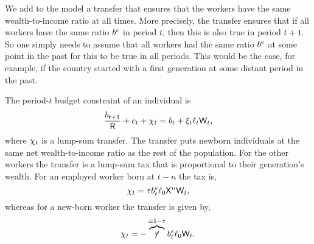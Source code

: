 \documentclass[titlepage,abstract,letterpaper]{econtex}
\begin{document}
We add to the model a transfer that ensures that the workers have the same wealth-to-income ratio at all times. More precisely, the transfer ensures that if all workers have the same ratio $b^{e}$ in period $t$, then this is also true in period $t+1$. So one simply needs to assume that all workers had the same ratio $b^{e}$ at some point in the past for this to be true in all periods. This would be the case, for example, if the country started with a first generation at some distant period in the past.

The period-$t$ budget constraint of an individual is
\begin{equation*}
\frac{b_{t+1}}{\mathsf{R}}+ c_{t}+\chi_{t}=b_{t}+\xi_{t} \ell_{t} \mathsf{W}_t,
\label{eq:ibcStakes}
\end{equation*}
where $\chi_{t}$ is a lump-sum transfer. The transfer puts newborn individuals at the same net wealth-to-income ratio as the rest of the population. For the other workers the transfer is a lump-sum tax that is proportional to their generation's wealth. For an employed worker born at $t-n$ the tax is,
\begin{equation}
\chi_{t}=\tau b^{e}_t \ell_0 \mathsf{X}^{n} \mathsf{W}_t, \label{eq:xFerE}
\end{equation}
whereas for a new-born worker the transfer is given by,
\begin{equation}
\chi_{t}=-\overbrace{\cancel{\tau}}^{\equiv 1-\tau} b^{e}_t \ell_0 \mathsf{W}_t. \label{eq:xFerAtBirth}
\end{equation}
\end{document}
